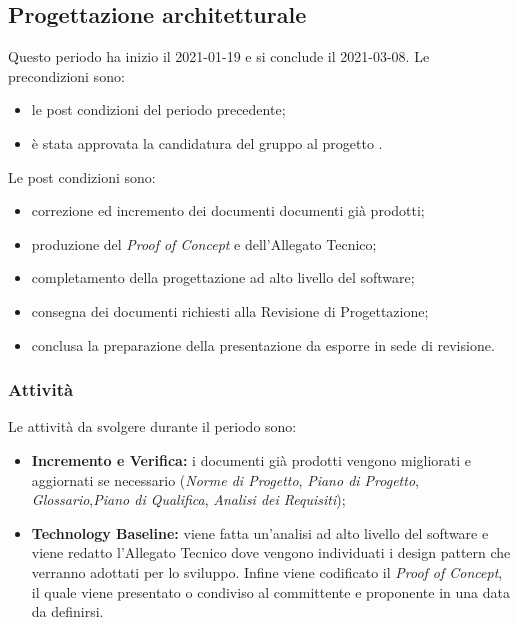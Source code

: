 \newpage
\subsection{Progettazione architetturale}
Questo periodo ha inizio il 2021-01-19 e si conclude il 2021-03-08.
Le precondizioni sono:
\begin{itemize}
	\item le post condizioni del periodo precedente;
	\item è stata approvata la candidatura del gruppo al progetto \NomeProgetto.
\end{itemize}
Le post condizioni sono:
\begin{itemize}
	\item correzione ed incremento dei documenti documenti già prodotti;
	\item produzione del \textit{Proof of Concept} e dell'Allegato Tecnico;
	\item completamento della progettazione ad alto livello del software;
	\item consegna dei documenti richiesti alla Revisione di Progettazione; 	
	\item conclusa la preparazione della presentazione da esporre in sede di revisione.
\end{itemize}
\subsubsection{Attività}
Le attività da svolgere durante il periodo sono:
\begin{itemize}
	\item \textbf{Incremento e Verifica:} i documenti già prodotti vengono migliorati e aggiornati se necessario (\textit{Norme di Progetto}, \textit{Piano di Progetto}, \textit{Glossario},\textit{Piano di Qualifica}, \textit{Analisi dei Requisiti});
	\item \textbf{Technology Baseline:} viene fatta un'analisi ad alto livello del software e viene redatto l'Allegato Tecnico dove vengono individuati i design pattern che verranno adottati per lo sviluppo. Infine viene codificato il \textit{Proof of Concept}, il quale viene presentato o condiviso al committente e proponente in una data da definirsi.
\end{itemize}
